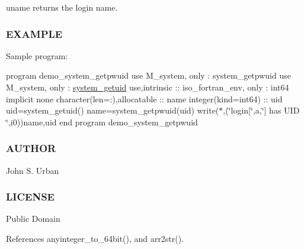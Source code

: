 uname returns the login name.

\subsubsection*{E\+X\+A\+M\+P\+LE}

Sample program\+:

program demo\+\_\+system\+\_\+getpwuid use M\+\_\+system, only \+: system\+\_\+getpwuid use M\+\_\+system, only \+: \mbox{\hyperlink{interfacem__system_1_1system__getuid}{system\+\_\+getuid}} use,intrinsic \+:\+: iso\+\_\+fortran\+\_\+env, only \+: int64 implicit none character(len=\+:),allocatable \+:\+: name integer(kind=int64) \+:\+: uid uid=system\+\_\+getuid() name=system\+\_\+getpwuid(uid) write($\ast$,\textquotesingle{}(\char`\"{}login\mbox{[}\char`\"{},a,\char`\"{}\mbox{]} has U\+I\+D \char`\"{},i0)\textquotesingle{})name,uid end program demo\+\_\+system\+\_\+getpwuid

\subsubsection*{A\+U\+T\+H\+OR}

John S. Urban \subsubsection*{L\+I\+C\+E\+N\+SE}

Public Domain 

References anyinteger\+\_\+to\+\_\+64bit(), and arr2str().

